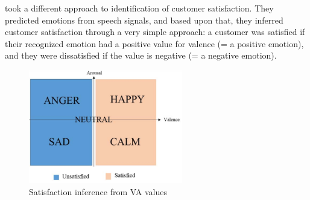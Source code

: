 \newline\newline \citet{Kamaruddin:2016:MeasuringCustomerSatisfaction} took a different approach to identification of customer satisfaction. They predicted emotions from speech signals, and based upon that, they inferred customer satisfaction through a very simple approach: a customer was satisfied if their recognized emotion had a positive value for valence (= a positive emotion), and they were dissatisfied if the value is negative (= a negative emotion).

\begin{figure}[H]
  \begin{center}
  \includegraphics[angle=0, width=0.6\textwidth]{Figures/Satisfaction_from_VA.PNG}
  \caption{Satisfaction inference from VA values}
  \label{fig:SatisfactionFromVA}
  \end{center}
\end{figure}

